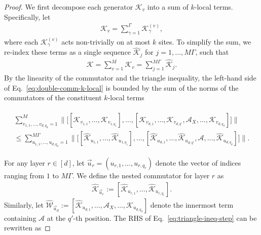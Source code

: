 \documentclass[aps,pra,reprint,groupedaddress,floatfix]{revtex4-2}
\newcommand{\mc}{\mathcal}
\begin{document}
\begin{proof}
    We first decompose each generator $\mathcal{K}_{v}$ into a sum of $k$-local terms. Specifically, let
    \begin{align*}
        \mc K_v = \sum_{\gamma=1}^{\Gamma} \mc K_{\gamma}^{(v)},
    \end{align*}
    where each $\mc K_{\gamma}^{(v)}$ acts non-trivially on at most $k$ sites. To simplify the sum, we re-index these terms as a single sequence $\hat{\mathcal{K}}_{j}$ for $j=1, \ldots, M\Gamma$, such that
    \begin{align*}
        \mc K = \sum_{v=1}^M \mc K_v = \sum_{j=1}^{M\Gamma} \hat{\mc K}_{j}.
    \end{align*}
    By the linearity of the commutator and the triangle inequality, the left-hand side of Eq.~\eqref{eq:double-comm-k-local} is bounded by the sum of the norms of the commutators of the constituent $k$-local terms
    \begin{widetext}
    \begin{align}
        \label{eq:triangle-ineq-step}
        \begin{multlined}
             \sum_{v_{1,1}, \ldots, v_{d, q_d}=1}^{M} \bigg\| \Big[ [\mathcal{K}_{v_{1,1}}, \ldots, \mathcal{K}_{v_{1, q_1}}], \ldots, 
        [\mathcal{K}_{v_{d,1}}, \ldots, \mathcal{K}_{v_{d, q'}}, \mathcal{A}_X, \ldots, \mathcal{K}_{v_{d, q_d}}] \Big] \bigg\| \\
        \le \sum_{u_{1,1}, \ldots, u_{d, q_d}=1}^{M\Gamma} \bigg\| \Big[ [\hat{\mathcal{K}}_{u_{1,1}}, \ldots, \hat{\mathcal{K}}_{u_{1, q_1}}], \ldots, 
        [\hat{\mathcal{K}}_{u_{d,1}}, \ldots, \hat{\mathcal{K}}_{u_{d, q'}}, \mathcal{A}, \ldots, \hat{\mathcal{K}}_{u_{d, q_d}}] \Big] \bigg\|.
        \end{multlined}
    \end{align}
    \end{widetext}
    For any layer $r \in [d]$, let $\vec{u}_r = (u_{r,1}, \ldots, u_{r, q_r})$ denote the vector of indices ranging from $1$ to $M\Gamma$. We define the nested commutator for layer $r$ as
    \begin{align*}
        \hat{\mathcal{K}}_{\vec{u}_r} := [\hat{\mathcal{K}}_{u_{r,1}}, \ldots, \hat{\mathcal{K}}_{u_{r, q_r}}].
    \end{align*}
    Similarly, let $\hat{\mathcal{W}}_{\vec{u}_d} := [\hat{\mathcal{K}}_{u_{d,1}}, \ldots, \mathcal{A}_X, \ldots, \hat{\mathcal{K}}_{u_{d, q_d}}]$ denote the innermost term containing $\mc A$ at the $q'$-th position.
    The RHS of Eq.~\eqref{eq:triangle-ineq-step} can be rewritten as

\end{proof}
\end{document}
